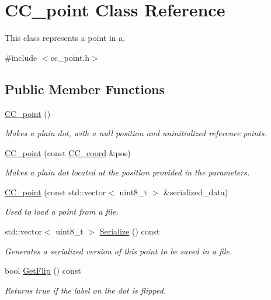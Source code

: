 \hypertarget{a00034}{\section{C\-C\-\_\-point Class Reference}
\label{a00034}
}


This class represents a point in a.  




{\ttfamily \#include $<$cc\-\_\-point.\-h$>$}

\subsection*{Public Member Functions}
\begin{DoxyCompactItemize}
\item 
\hyperlink{a00034_aca83bde44f92cd505fc2bd1d2cae2ade}{C\-C\-\_\-point} ()
\begin{DoxyCompactList}\small\item\em Makes a plain dot, with a null position and uninitialized reference points. \end{DoxyCompactList}\item 
\hyperlink{a00034_a5cf13d3ea61c85cdcb44048e3be9b9d5}{C\-C\-\_\-point} (const \hyperlink{a00029}{C\-C\-\_\-coord} \&pos)
\begin{DoxyCompactList}\small\item\em Makes a plain dot located at the position provided in the parameters. \end{DoxyCompactList}\item 
\hyperlink{a00034_ae8a3a993cb0e38634f347af41ede4594}{C\-C\-\_\-point} (const std\-::vector$<$ uint8\-\_\-t $>$ \&serialized\-\_\-data)
\begin{DoxyCompactList}\small\item\em Used to load a point from a file. \end{DoxyCompactList}\item 
std\-::vector$<$ uint8\-\_\-t $>$ \hyperlink{a00034_a2de2c8ccca571f59abaf282a2c44a7e5}{Serialize} () const 
\begin{DoxyCompactList}\small\item\em Generates a serialized version of this point to be saved in a file. \end{DoxyCompactList}\item 
bool \hyperlink{a00034_adb7c6247e92c09adcc068dad928db579}{Get\-Flip} () const 
\begin{DoxyCompactList}\small\item\em Returns true if the label on the dot is flipped. \end{DoxyCompactList}\item 

\end{DoxyCompactItemize}
